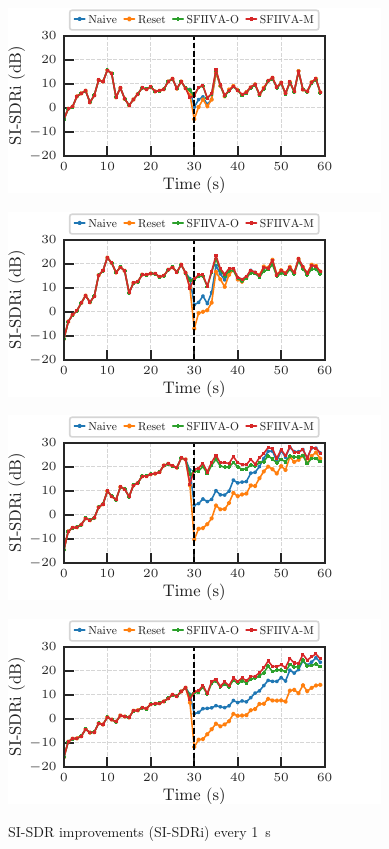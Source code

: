 \documentclass[sip,biber]{now-journal}
\begin{document}
\begin{figure}[t]
  \begin{minipage}[t]{.45\textwidth}
    \centering\includegraphics{figures/plots/online/line_900.pdf}\label{fig:plot:line:900}
  \end{minipage}
  \begin{minipage}[t]{.45\textwidth}
    \centering\includegraphics{figures/plots/online/line_950.pdf}\label{fig:plot:line:950}
  \end{minipage}
  \vspace{.5em}

  \begin{minipage}[t]{.45\textwidth}
    \centering\includegraphics{figures/plots/online/line_980.pdf}\label{fig:plot:line:980}
  \end{minipage}
  \begin{minipage}[t]{.45\textwidth}
    \centering\includegraphics{figures/plots/online/line_990.pdf}\label{fig:plot:line:990}
  \end{minipage}
  \caption{SI-SDR improvements (SI-SDRi) every \SI{1}{\second}}%
  \label{fig:plot:line}
\end{figure}
\end{document}
